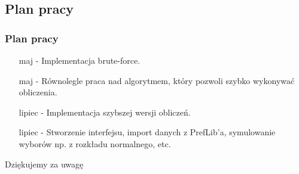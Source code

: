 \documentclass{beamer}
\begin{document}

\subsection{Plan pracy}

\begin{frame}
\frametitle{Plan pracy}
\begin{itemize}
\item [maj -] Implementacja brute-force.
\item [maj -] Równolegle praca nad algorytmem, który pozwoli szybko wykonywać obliczenia.
\item [lipiec -] Implementacja szybszej wersji obliczeń.
\item [lipiec -] Stworzenie interfejsu, import danych z PrefLib'a, symulowanie wyborów np. z rozkładu normalnego, etc.
\end{itemize}
\end{frame}



\begin{frame}
\Huge{\centerline{Dziękujemy za uwagę}}
\end{frame}

\end{document}
